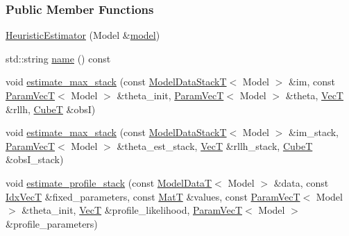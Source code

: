 \subsubsection*{Public Member Functions}
\begin{DoxyCompactItemize}
\item 
\hyperlink{classmappel_1_1HeuristicEstimator_a51e2263b42adf83c66a5b8d2348a6bd6}{Heuristic\+Estimator} (Model \&\hyperlink{classmappel_1_1Estimator_a8322546d87ccdf01f8b0dcd9dae509f0}{model})
\item 
std\+::string \hyperlink{classmappel_1_1HeuristicEstimator_a6c9efb24639627b3f3b3eb151e02d43b}{name} () const 
\item 
void \hyperlink{classmappel_1_1ThreadedEstimator_afb7a2e27b4e8dcc2fa604f83344461fe}{estimate\+\_\+max\+\_\+stack} (const \hyperlink{namespacemappel_aaeb6665bc57476dd93c2df6ad8bc4768}{Model\+Data\+StackT}$<$ Model $>$ \&im, const \hyperlink{namespacemappel_a0f86d3153e4e27b095012f140eea58de}{Param\+VecT}$<$ Model $>$ \&theta\+\_\+init, \hyperlink{namespacemappel_a0f86d3153e4e27b095012f140eea58de}{Param\+VecT}$<$ Model $>$ \&theta, \hyperlink{namespacemappel_a2225ad69f358daa3f4f99282a35b9a3a}{VecT} \&rllh, \hyperlink{namespacemappel_ab2afab4e6c8805e83946670d882768c2}{CubeT} \&obsI)
\item 
void \hyperlink{classmappel_1_1Estimator_aa1b1c2677df2c6ea9fcf67b6a0856e46}{estimate\+\_\+max\+\_\+stack} (const \hyperlink{namespacemappel_aaeb6665bc57476dd93c2df6ad8bc4768}{Model\+Data\+StackT}$<$ Model $>$ \&im\+\_\+stack, \hyperlink{namespacemappel_a0f86d3153e4e27b095012f140eea58de}{Param\+VecT}$<$ Model $>$ \&theta\+\_\+est\+\_\+stack, \hyperlink{namespacemappel_a2225ad69f358daa3f4f99282a35b9a3a}{VecT} \&rllh\+\_\+stack, \hyperlink{namespacemappel_ab2afab4e6c8805e83946670d882768c2}{CubeT} \&obs\+I\+\_\+stack)
\item 
void \hyperlink{classmappel_1_1ThreadedEstimator_aebbf686f95be1331ff85cecd5a3c97db}{estimate\+\_\+profile\+\_\+stack} (const \hyperlink{namespacemappel_a97f050df953605381ae9c901c3b125f1}{Model\+DataT}$<$ Model $>$ \&data, const \hyperlink{namespacemappel_ac63743dcd42180127307cd0e4ecdd784}{Idx\+VecT} \&fixed\+\_\+parameters, const \hyperlink{namespacemappel_a7091ab87c528041f7e2027195fad8915}{MatT} \&values, const \hyperlink{namespacemappel_a0f86d3153e4e27b095012f140eea58de}{Param\+VecT}$<$ Model $>$ \&theta\+\_\+init, \hyperlink{namespacemappel_a2225ad69f358daa3f4f99282a35b9a3a}{VecT} \&profile\+\_\+likelihood, \hyperlink{namespacemappel_a0f86d3153e4e27b095012f140eea58de}{Param\+VecT}$<$ Model $>$ \&profile\+\_\+parameters)

\end{DoxyCompactItemize}
